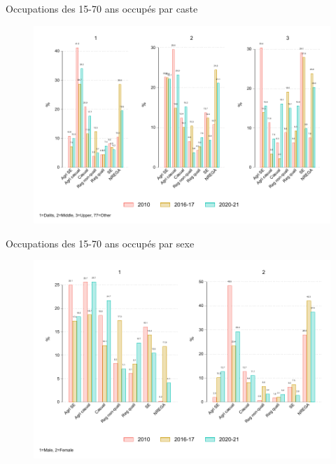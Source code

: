 \documentclass[aspectratio=169]{beamer}
\begin{document}
\begin{frame}[plain, shrink=2]{Occupations des 15-70 ans occupés par caste}
\begin{figure}[htpb]
\centering
\includegraphics[scale=0.9]{INPUT/occ_year_caste.pdf}
\end{figure}
\end{frame}



\begin{frame}[plain, shrink=2]{Occupations des 15-70 ans occupés par sexe}
\begin{figure}[htpb]
\centering
\includegraphics[scale=0.9]{INPUT/occ_year_sex.pdf}
\end{figure}
\end{frame}
\end{document}
